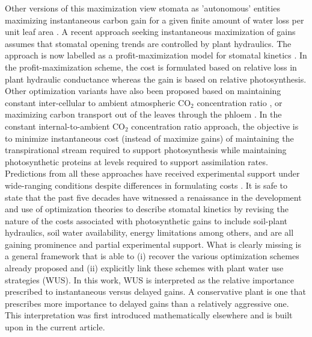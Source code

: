 \documentclass[utf8]{frontiersSCNS} %
\begin{document}
Other versions of this maximization view stomata as 'autonomous' entities maximizing instantaneous carbon gain for a given finite amount of water loss per unit leaf area \citep{katul_leaf_2009}.  A recent approach seeking instantaneous maximization of gains assumes that stomatal opening trends are controlled by plant hydraulics.  The approach is now labelled as a profit-maximization model for stomatal kinetics \citep{sperry_pragmatic_2016,sperry_predicting_2017}. In the profit-maximization scheme, the cost is formulated based on relative loss in plant hydraulic conductance whereas the gain is based on relative photosynthesis.  Other optimization variants have also been proposed based on maintaining constant inter-cellular to ambient atmospheric CO$_2$ concentration ratio \citep{prentice2014balancing}, or maximizing carbon transport out of the leaves through the phloem \citep{nikinmaa_assimilate_2013}.  In the constant internal-to-ambient CO$_2$ concentration ratio approach, the objective is to minimize instantaneous cost (instead of maximize gains) of maintaining the transpirational stream required to support photosynthesis while maintaining photosynthetic proteins at levels required to support assimilation rates.  Predictions from all these approaches have received experimental support under wide-ranging conditions despite differences in formulating costs  \citep{nikinmaa_assimilate_2013,prentice2014balancing,sperry_predicting_2017}.
It is safe to state that the past five decades have witnessed a renaissance in the development and use of optimization theories to describe stomatal kinetics by revising the nature of the costs associated with photosynthetic gains to include soil-plant hydraulics, soil water availability, energy limitations \citep{roth2018fossil} among others, and are all gaining prominence and partial experimental support. What is clearly missing is a general framework that is able to (i) recover the various optimization schemes already proposed and (ii) explicitly link these schemes with plant water use strategies (WUS). In this work, WUS is interpreted as the relative importance prescribed to instantaneous versus delayed gains. A conservative plant is one that prescribes more importance to delayed gains than a relatively aggressive one. This interpretation was first introduced mathematically elsewhere \citep{manzoni_optimization_2013} and is built upon in the current article.
\end{document}
